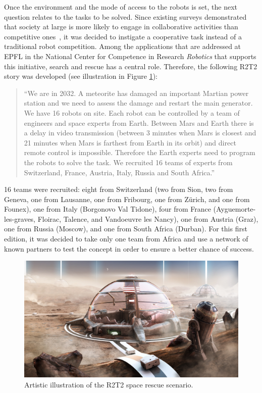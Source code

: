 \documentclass{intech-journal}
\begin{document}
Once the environment and the mode of access to the robots is set, the next question relates to the tasks to be solved.
Since existing surveys demonstrated that society at large is more likely to engage in collaborative activities than competitive ones~\cite{riedo2013upgrade}, it was decided to instigate a cooperative task instead of a traditional robot competition. 
Among the applications that are addressed at EPFL in the National Center for Competence in Research \textit{Robotics} that supports this initiative, search and rescue has a central role.
Therefore, the following R2T2 story was developed (see illustration in Figure \ref{fig:illustration}):
\begin{quotation}
``We are in 2032. A meteorite has damaged an important Martian power station and we need to assess the damage and restart the main generator. We have 16 robots on site. Each robot can be controlled by a team of engineers and space experts from Earth. Between Mars and Earth there is a delay in video transmission (between 3 minutes when Mars is closest and 21 minutes when Mars is farthest from Earth in its orbit) and direct remote control is impossible. Therefore the Earth experts need to program the robots to solve the task. We recruited 16 teams of experts from Switzerland, France, Austria, Italy, Russia and South Africa.''
\end{quotation}
16 teams were recruited: eight from Switzerland (two from Sion, two from Geneva, one from Lausanne, one from Fribourg, one from Z\"urich, and one from Founex), one from Italy (Borgonovo Val Tidone), four from France (Ayguemorte-les-graves, Floirac, Talence, and Vandoeuvre les Nancy), one from Austria (Graz), one from Russia (Moscow), and one from South Africa (Durban). 
For this first edition, it was decided to take only one team from Africa and use a network of known partners to test the concept in order to ensure a better chance of success.

\begin{figure}[ht]
 \centering
    \includegraphics[width=0.65\columnwidth]{figures/r2t2_illu.jpg}
  \caption{Artistic illustration of the R2T2 space rescue scenario.}
  \label{fig:illustration} 
\end{figure}
\end{document}
